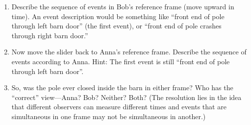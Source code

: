 \begin{enumerate}
\item Describe the sequence of events in Bob's reference frame (move upward in time).  An event description would be something like ``front end of pole through left barn door'' (the first event), or ``front end of pole crashes through right barn door.''
\answerspace{1.3in}


\item Now move the slider back to Anna's reference frame. Describe the sequence of events according to Anna.  Hint: The first event is still ``front end of pole through left barn door''.
\answerspace{1.3in}


\item So, was the pole ever closed inside the barn in either frame? Who has the ``correct'' view---Anna? Bob? Neither? Both?  (The resolution lies in the idea that different observers can measure different times and events that are simultaneous in one frame may not be simultaneous in another.)
\answerspace{1.1in}

\end{enumerate}
